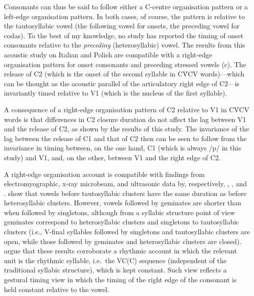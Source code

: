 \documentclass[preprint]{JASAnew}
\begin{document}
Consonants can thus be said to follow either a C-centre organisation
pattern or a left-edge organisation pattern. In both cases, of course,
the pattern is relative to the tautosyllabic vowel (the following vowel
for onsets, the preceding vowel for codas). To the best of my knowledge,
no study has reported the timing of onset consonants relative to the
\emph{preceding} (heterosyllabic) vowel. The results from this acoustic
study on Italian and Polish are compatible with a right-edge
organisation pattern for onset consonants and preceding stressed vowels
(c). The release of C2 (which is the onset of the
second syllable in CV́CV words)---which can be thought as the acoustic
parallel of the articulatory right edge of C2---is invariantly timed
relative to V1 (which is the nucleus of the first syllable).

A consequence of a right-edge organisation pattern of C2 relative to V1
in CV́CV words is that differences in C2 closure duration do not affect
the lag between V1 and the release of C2, as shown by the results of
this study. The invariance of the lag between the release of C1 and that
of C2 then can be seen to follow from the invariance in timing between,
on the one hand, C1 (which is always /p/ in this study) and V1, and, on
the other, between V1 and the right edge of C2.

A right-edge organisation account is compatible with findings from
electromyographic, x-ray microbeam, and ultrasonic data by,
respectively, \citet{raphael1975}, \citet{de-jong1991}, and
\citet{celata2018}. \citet{celata2018} show that vowels before
tautosyllabic clusters have the same duration as before heterosyllabic
clusters. However, vowels followed by geminates are shorter than when
followed by singletons, although from a syllabic structure point of view
geminates correspond to heterosyllabic clusters and singletons to
tautosyllabic clusters (i.e., V-final syllables followed by singletons
and tautosyllabic clusters are open, while those followed by geminates
and heterosyllabic clusters are closed). \citet{celata2018} argue that
these results corroborate a rhythmic account in which the relevant unit
is the rhythmic syllable, i.e.~the VC(C) sequence (independent of the
traditional syllabic structure), which is kept constant. Such view
reflects a gestural timing view in which the timing of the right edge of
the consonant is held constant relative to the vowel.
\end{document}

